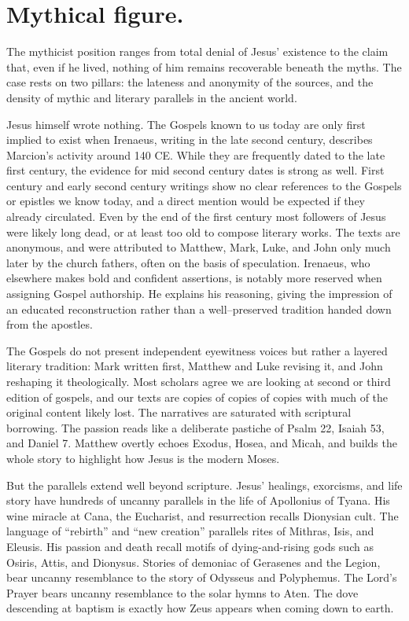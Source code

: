 \section{Mythical figure.}\label{sec:mythical}

The mythicist position ranges from total denial of Jesus’ existence to the claim that, even if he lived, nothing of him remains recoverable beneath the myths.
The case rests on two pillars: the lateness and anonymity of the sources, and the density of mythic and literary parallels in the ancient world.

Jesus himself wrote nothing.
The Gospels known to us today are only first implied to exist when Irenaeus, writing in the late second century, describes Marcion’s activity around 140 CE.
While they are frequently dated to the late first century, the evidence for mid second century dates is strong as well.
First century and early second century writings show no clear references to the Gospels or epistles we know today, and a direct mention would be expected if they already circulated.
Even by the end of the first century most followers of Jesus were likely long dead, or at least too old to compose literary works.
The texts are anonymous, and were attributed to Matthew, Mark, Luke, and John only much later by the church fathers, often on the basis of speculation.
Irenaeus, who elsewhere makes bold and confident assertions, is notably more reserved when assigning Gospel authorship.
He explains his reasoning, giving the impression of an educated reconstruction rather than a well–preserved tradition handed down from the apostles.

The Gospels do not present independent eyewitness voices but rather a layered literary tradition: Mark written first, Matthew and Luke revising it, and John reshaping it theologically.
Most scholars agree we are looking at second or third edition of gospels, and our texts are copies of copies of copies with much of the original content likely lost.
The narratives are saturated with scriptural borrowing.
The passion reads like a deliberate pastiche of Psalm 22, Isaiah 53, and Daniel 7.
Matthew overtly echoes Exodus, Hosea, and Micah, and builds the whole story to highlight how Jesus is the modern Moses.

But the parallels extend well beyond scripture.
Jesus’ healings, exorcisms, and life story have hundreds of uncanny parallels in the life of Apollonius of Tyana.
His wine miracle at Cana, the Eucharist, and resurrection recalls Dionysian cult.
The language of “rebirth” and “new creation” parallels rites of Mithras, Isis, and Eleusis.
His passion and death recall motifs of dying-and-rising gods such as Osiris, Attis, and Dionysus.
Stories of demoniac of Gerasenes and the Legion, bear uncanny resemblance to the story of Odysseus and Polyphemus.
The Lord’s Prayer bears uncanny resemblance to the solar hymns to Aten.
The dove descending at baptism is exactly how Zeus appears when coming down to earth.

